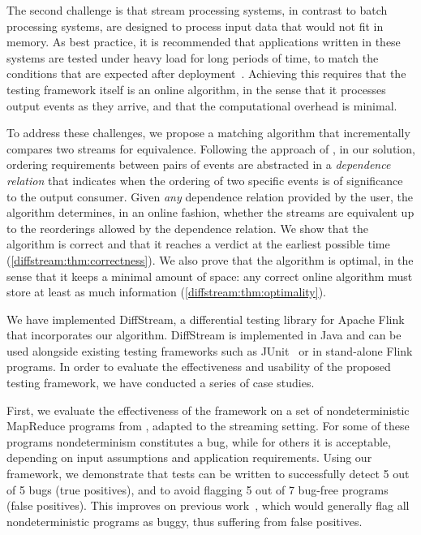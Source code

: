 The second challenge is that
stream processing systems, in contrast to batch processing systems,
are designed to process input data that would not fit
in memory.  As best practice, it is recommended that applications written in these systems are
tested under heavy load for long periods of time, to match the
conditions that are expected after
deployment~\cite{vianna2019exploratory}. Achieving this requires that
the testing framework itself is an online algorithm, in the sense that
it processes output events as they arrive, and that the computational overhead is minimal.

To address these challenges, we propose a matching algorithm that incrementally compares two streams for equivalence.
Following the approach of , in our solution, ordering requirements between pairs of events are abstracted in a \emph{dependence relation} that indicates when the ordering of two specific events is of significance to the output consumer.
Given \emph{any} dependence relation provided by the user, the algorithm determines, in an online fashion, whether the streams are equivalent up to the reorderings allowed by the dependence relation.
We show that the algorithm is correct and that it reaches a verdict at the earliest possible time (\cref{diffstream:thm:correctness}).
We also prove that the algorithm is optimal, in the sense that it keeps a minimal amount of space: any correct online algorithm must store at least as much information (\cref{diffstream:thm:optimality}).

We have implemented DiffStream{}, a differential testing library for Apache Flink that incorporates our algorithm.
DiffStream{} is implemented in Java and can be used alongside existing
testing frameworks such as
JUnit~\cite{JUnitWeb} or in stand-alone Flink programs.
In order to evaluate the effectiveness and usability of the proposed testing framework, we have conducted a series of case studies.

First, we evaluate the effectiveness of the framework on a
set of nondeterministic MapReduce programs from \cite{xiao2014nondeterminism}, adapted to the streaming setting.
For some of these programs nondeterminism constitutes a bug, while for others it is acceptable, depending on input assumptions and application requirements.
Using our framework, we demonstrate that tests can be written to successfully detect 5 out of 5 bugs (true positives), and to avoid flagging 5 out of 7 bug-free programs (false positives).
This improves on previous work~\cite{xu2013testing}, which would generally flag all nondeterministic programs as buggy, thus suffering from false positives.

